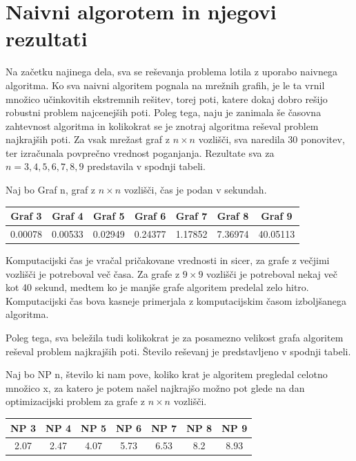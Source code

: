 \documentclass[a4paper, 12 pt]{article}
\theoremstyle{definition} %
\theoremstyle{plain} %
\theoremstyle{definition}
\begin{document}
\section{Naivni algorotem in njegovi rezultati}

Na začetku najinega dela, sva se reševanja problema lotila z uporabo naivnega algoritma. Ko sva naivni algoritem pognala na mrežnih grafih, je le ta vrnil množico učinkovitih ekstremnih rešitev, torej poti, katere dokaj dobro rešijo robustni problem najcenejših poti. Poleg tega, naju je zanimala še časovna zahtevnost algoritma in kolikokrat se je znotraj algoritma reševal problem najkrajših poti.
Za vsak mrežast graf z $n \times n$ vozlišči, sva naredila 30 ponovitev, ter izračunala povprečno vrednost poganjanja. Rezultate sva za $n = 3, 4, 5, 6, 7, 8, 9$ predstavila v spodnji tabeli.\newline


Naj bo Graf n, graf z $n \times n$ vozlišči, čas je podan v sekundah.

\begin{center}
 \begin{tabular}{||c c c c c c c||} 
 \hline
Graf 3 & Graf 4 & Graf 5 & Graf 6 & Graf 7 & Graf 8 & Graf 9 \\ 
 \hline
\hline
0.00078 & 0.00533 & 0.02949 & 0.24377 & 1.17852 & 7.36974 & 40.05113 \\
 \hline
\end{tabular}
\end{center}

Komputacijski čas je vračal pričakovane vrednosti in sicer, za grafe z večjimi vozlišči je potreboval več časa. Za grafe z $9 \times 9$ vozlišči je potreboval nekaj več kot 40 sekund, medtem ko je manjše grafe algoritem predelal zelo hitro. Komputacijski čas bova kasneje primerjala z komputacijskim časom izboljšanega algoritma.\newline

Poleg tega, sva beležila tudi kolikokrat je za posamezno velikost grafa algoritem reševal problem najkrajših poti. Število reševanj je predstavljeno v spodnji tabeli.\newline

\bigskip
Naj bo NP n, število ki nam pove, koliko krat je algoritem pregledal celotno množico x, za katero je potem našel najkrajšo možno pot glede na dan optimizacijski problem za grafe z $n \times n$ vozlišči.
\begin{center}
 \begin{tabular}{||c c c c c c c||} 
 \hline
 NP 3 &  NP 4 &  NP 5 &  NP 6 &  NP 7 &  NP 8 &  NP 9 \\ 
 \hline
\hline
2.07 & 2.47 & 4.07 & 5.73 & 6.53 & 8.2 & 8.93\\
 \hline
\end{tabular}
\end{center}
\end{document}
